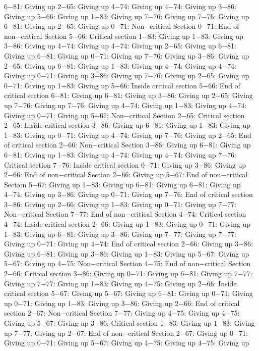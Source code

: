 6−81: Giving up
2−65: Giving up
4−74: Giving up
4−74: Giving up
3−86: Giving up
5−66: Giving up
1−83: Giving up
7−76: Giving up
7−76: Giving up
6−81: Giving up
2−65: Giving up
0−71: Non−critical Section
0−71: End of non−critical Section
5−66: Critical section
1−83: Giving up
1−83: Giving up
3−86: Giving up
4−74: Giving up
4−74: Giving up
2−65: Giving up
6−81: Giving up
6−81: Giving up
0−71: Giving up
7−76: Giving up
3−86: Giving up
2−65: Giving up
6−81: Giving up
1−83: Giving up
4−74: Giving up
4−74: Giving up
0−71: Giving up
3−86: Giving up
7−76: Giving up
2−65: Giving up
0−71: Giving up
1−83: Giving up
5−66: Inside critical section
5−66: End of critical section
6−81: Giving up
6−81: Giving up
3−86: Giving up
2−65: Giving up
7−76: Giving up
7−76: Giving up
4−74: Giving up
1−83: Giving up
4−74: Giving up
0−71: Giving up
5−67: Non−critical Section
2−65: Critical section
2−65: Inside critical section
3−86: Giving up
6−81: Giving up
1−83: Giving up
1−83: Giving up
0−71: Giving up
4−74: Giving up
7−76: Giving up
2−65: End of critical section
2−66: Non−critical Section
3−86: Giving up
6−81: Giving up
6−81: Giving up
1−83: Giving up
4−74: Giving up
4−74: Giving up
7−76: Critical section
7−76: Inside critical section
0−71: Giving up
3−86: Giving up
2−66: End of non−critical Section
2−66: Giving up
5−67: End of non−critical Section
5−67: Giving up
1−83: Giving up
6−81: Giving up
6−81: Giving up
4−74: Giving up
3−86: Giving up
0−71: Giving up
7−76: End of critical section
3−86: Giving up
2−66: Giving up
1−83: Giving up
0−71: Giving up
7−77: Non−critical Section
7−77: End of non−critical Section
4−74: Critical section
4−74: Inside critical section
2−66: Giving up
1−83: Giving up
0−71: Giving up
1−83: Giving up
6−81: Giving up
3−86: Giving up
7−77: Giving up
7−77: Giving up
0−71: Giving up
4−74: End of critical section
2−66: Giving up
3−86: Giving up
6−81: Giving up
3−86: Giving up
1−83: Giving up
5−67: Giving up
5−67: Giving up
4−75: Non−critical Section
4−75: End of non−critical Section
2−66: Critical section
3−86: Giving up
0−71: Giving up
6−81: Giving up
7−77: Giving up
7−77: Giving up
1−83: Giving up
4−75: Giving up
2−66: Inside critical section
5−67: Giving up
5−67: Giving up
6−81: Giving up
0−71: Giving up
0−71: Giving up
1−83: Giving up
3−86: Giving up
2−66: End of critical section
2−67: Non−critical Section
7−77: Giving up
4−75: Giving up
4−75: Giving up
5−67: Giving up
3−86: Critical section
1−83: Giving up
1−83: Giving up
7−77: Giving up
2−67: End of non−critical Section
2−67: Giving up
0−71: Giving up
0−71: Giving up
5−67: Giving up
4−75: Giving up
4−75: Giving up
